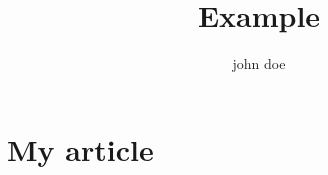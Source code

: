 \documentclass[12pt, twocolumn]{article}
\begin{document}
    \title{Example}
    \author{john doe}
    \date{}
    \maketitle

    \section{My article}
    
    \lipsum[1-4]
\end{document}
